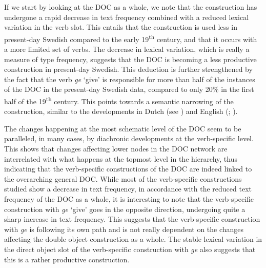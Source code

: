 \documentclass[output=paper]{langscibook}
\begin{document}
If we start by looking at the DOC as a whole, we note that the construction has undergone a rapid decrease in text frequency combined with a reduced lexical variation in the verb slot. This entails that the construction is used less in present-day Swedish compared to the early 19\textsuperscript{th} century, and that it occurs with a more limited set of verbs. The decrease in lexical variation, which is really a measure of type frequency, suggests that the DOC is becoming a less productive construction in present-day Swedish. This deduction is further strengthened by the fact that the verb \textit{ge} ‘give’ is responsible for more than half of the instances of the DOC in the present-day Swedish data, compared to only 20\% in the first half of the 19\textsuperscript{th} century. This points towards a semantic narrowing of the construction, similar to the developments in Dutch (see \citealt{Colleman2011}) and English (\citealt{CollemanDe_Clerck2011}; \citealt{Zehentner2018}).



The changes happening at the most schematic level of the DOC seem to be paralleled, in many cases, by diachronic developments at the verb-specific level. This shows that changes affecting lower nodes in the DOC network are interrelated with what happens at the topmost level in the hierarchy, thus indicating that the verb-specific constructions of the DOC are indeed linked to the overarching general DOC. While most of the verb-specific constructions studied show a decrease in text frequency, in accordance with the reduced text frequency of the DOC as a whole, it is interesting to note that the verb-specific construction with \textit{ge} ‘give’ goes in the opposite direction, undergoing quite a sharp increase in text frequency. This suggests that the verb-specific construction with \textit{ge} is following its own path and is not really dependent on the changes affecting the double object construction as a whole. The stable lexical variation in the direct object slot of the verb-specific construction with \textit{ge} also suggests that this is a rather productive construction.
\end{document}
